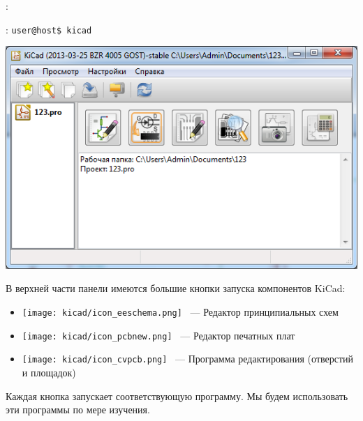\win: 

\linux: \verb|user@host$ kicad|

\bigskip
\includegraphics[height=0.8\textheight]{kicad/projman.png}

\bigskip
В верхней части панели   имеются большие
кнопки запуска компонентов KiCad:

\begin{itemize}
\item
\texttt{[image: kicad/icon\_eeschema.png]}
\ --- Редактор принципиальных схем
\item
\texttt{[image: kicad/icon\_pcbnew.png]}
\ --- Редактор печатных плат
\item
\texttt{[image: kicad/icon\_cvpcb.png]}
\ --- Программа редактирования 
(отверстий и площадок)
\end{itemize}

Каждая кнопка запускает соответствующую программу. Мы будем использовать эти
программы по мере изучения.
